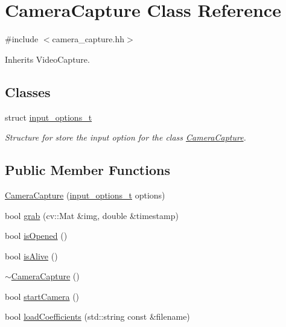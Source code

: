 \hypertarget{class_camera_capture}{}\section{Camera\+Capture Class Reference}
\label{class_camera_capture}


{\ttfamily \#include $<$camera\+\_\+capture.\+hh$>$}



Inherits Video\+Capture.

\subsection*{Classes}
\begin{DoxyCompactItemize}
\item 
struct \mbox{\hyperlink{struct_camera_capture_1_1input__options__t}{input\+\_\+options\+\_\+t}}
\begin{DoxyCompactList}\small\item\em Structure for store the input option for the class \mbox{\hyperlink{class_camera_capture}{Camera\+Capture}}. \end{DoxyCompactList}\end{DoxyCompactItemize}
\subsection*{Public Member Functions}
\begin{DoxyCompactItemize}
\item 
\mbox{\hyperlink{class_camera_capture_acc2084c1dbede6786f3c6ac3d0f87253}{Camera\+Capture}} (\mbox{\hyperlink{struct_camera_capture_1_1input__options__t}{input\+\_\+options\+\_\+t}} options)
\item 
bool \mbox{\hyperlink{class_camera_capture_a67265c7fc4dfe416c2692074914ac1eb}{grab}} (cv\+::\+Mat \&img, double \&timestamp)
\item 
bool \mbox{\hyperlink{class_camera_capture_aee6826fb71be8027ba4e421d5e52e719}{is\+Opened}} ()
\item 
bool \mbox{\hyperlink{class_camera_capture_a1735b9892d336c6591ef932a9516af1c}{is\+Alive}} ()
\item 
\mbox{\hyperlink{class_camera_capture_a9fb9058c34d463b8bf9055b2f129adac}{$\sim$\+Camera\+Capture}} ()
\item 
bool \mbox{\hyperlink{class_camera_capture_a8b11e21f8886811195f691ca54ec7c80}{start\+Camera}} ()
\item 
bool \mbox{\hyperlink{class_camera_capture_a69ae39c83c49aa213df7a93487e8f17f}{load\+Coefficients}} (std\+::string const \&filename)
\end{DoxyCompactItemize}



